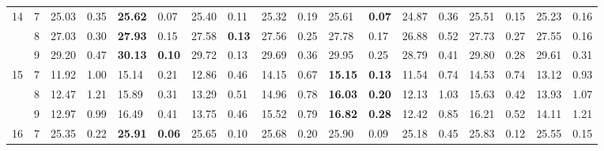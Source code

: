 \documentclass[conference]{IEEEtran}
\begin{document}
\begin{table}[]
\begin{tabular}{|cc|ll|ll|ll|ll|ll|ll|ll|ll|}
		\multicolumn{1}{|c|}{\multirow{3}{*}{14}} & 7 & \multicolumn{1}{l|}{25.03} & 0.35 & \multicolumn{1}{l|}{\textbf{25.62}} & 0.07 & \multicolumn{1}{l|}{25.40} & 0.11 & \multicolumn{1}{l|}{25.32} & 0.19 & \multicolumn{1}{l|}{25.61} & \textbf{0.07} & \multicolumn{1}{l|}{24.87} & 0.36 & \multicolumn{1}{l|}{25.51} & 0.15 & \multicolumn{1}{l|}{25.23} & 0.16 \\ \cline{2-18} 
		\multicolumn{1}{|c|}{} & 8 & \multicolumn{1}{l|}{27.03} & 0.30 & \multicolumn{1}{l|}{\textbf{27.93}} & 0.15 & \multicolumn{1}{l|}{27.58} & \textbf{0.13} & \multicolumn{1}{l|}{27.56} & 0.25 & \multicolumn{1}{l|}{27.78} & 0.17 & \multicolumn{1}{l|}{26.88} & 0.52 & \multicolumn{1}{l|}{27.73} & 0.27 & \multicolumn{1}{l|}{27.55} & 0.16 \\ \cline{2-18} 
		\multicolumn{1}{|c|}{} & 9 & \multicolumn{1}{l|}{29.20} & 0.47 & \multicolumn{1}{l|}{\textbf{30.13}} & \textbf{0.10} & \multicolumn{1}{l|}{29.72} & 0.13 & \multicolumn{1}{l|}{29.69} & 0.36 & \multicolumn{1}{l|}{29.95} & 0.25 & \multicolumn{1}{l|}{28.79} & 0.41 & \multicolumn{1}{l|}{29.80} & 0.28 & \multicolumn{1}{l|}{29.61} & 0.31 \\ \hline
		\multicolumn{1}{|c|}{\multirow{3}{*}{15}} & 7 & \multicolumn{1}{l|}{11.92} & 1.00 & \multicolumn{1}{l|}{15.14} & 0.21 & \multicolumn{1}{l|}{12.86} & 0.46 & \multicolumn{1}{l|}{14.15} & 0.67 & \multicolumn{1}{l|}{\textbf{15.15}} & \textbf{0.13} & \multicolumn{1}{l|}{11.54} & 0.74 & \multicolumn{1}{l|}{14.53} & 0.74 & \multicolumn{1}{l|}{13.12} & 0.93 \\ \cline{2-18} 
		\multicolumn{1}{|c|}{} & 8 & \multicolumn{1}{l|}{12.47} & 1.21 & \multicolumn{1}{l|}{15.89} & 0.31 & \multicolumn{1}{l|}{13.29} & 0.51 & \multicolumn{1}{l|}{14.96} & 0.78 & \multicolumn{1}{l|}{\textbf{16.03}} & \textbf{0.20} & \multicolumn{1}{l|}{12.13} & 1.03 & \multicolumn{1}{l|}{15.63} & 0.42 & \multicolumn{1}{l|}{13.93} & 1.07 \\ \cline{2-18} 
		\multicolumn{1}{|c|}{} & 9 & \multicolumn{1}{l|}{12.97} & 0.99 & \multicolumn{1}{l|}{16.49} & 0.41 & \multicolumn{1}{l|}{13.75} & 0.46 & \multicolumn{1}{l|}{15.52} & 0.79 & \multicolumn{1}{l|}{\textbf{16.82}} & \textbf{0.28} & \multicolumn{1}{l|}{12.42} & 0.85 & \multicolumn{1}{l|}{16.21} & 0.52 & \multicolumn{1}{l|}{14.11} & 1.21 \\ \hline
		\multicolumn{1}{|c|}{\multirow{3}{*}{16}} & 7 & \multicolumn{1}{l|}{25.35} & 0.22 & \multicolumn{1}{l|}{\textbf{25.91}} & \textbf{0.06} & \multicolumn{1}{l|}{25.65} & 0.10 & \multicolumn{1}{l|}{25.68} & 0.20 & \multicolumn{1}{l|}{25.90} & 0.09 & \multicolumn{1}{l|}{25.18} & 0.45 & \multicolumn{1}{l|}{25.83} & 0.12 & \multicolumn{1}{l|}{25.55} & 0.15 \\ \cline{2-18} 

\end{tabular}
\end{table}
\end{document}
